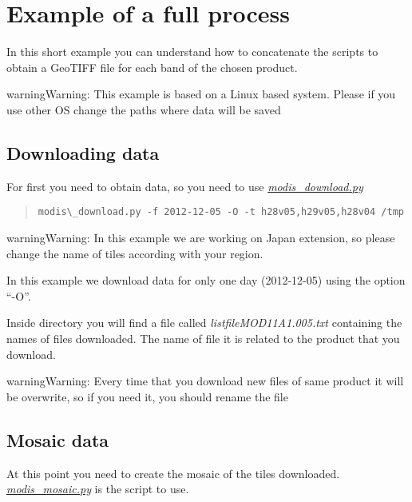 \documentclass[a4paper,11pt,oneside]{sphinxmanual}
\begin{document}
\chapter{Example of a full process}
\label{examples/full_example::doc}\label{examples/full_example:example-of-a-full-process}
In this short example you can understand how to concatenate
the scripts to obtain a GeoTIFF file for each band of the
chosen product.

\begin{notice}{warning}{Warning:}
This example is based on a Linux based system. Please if
you use other OS change the paths where data will be saved
\end{notice}


\section{Downloading data}
\label{examples/full_example:downloading-data}
For first you need to obtain data, so you need to use {\hyperref[scripts/modis_download::doc]{\emph{modis\_download.py}}}
\begin{quote}

\begin{Verbatim}[commandchars=\\\{\}]
modis\_download.py -f 2012-12-05 -O -t h28v05,h29v05,h28v04 /tmp
\end{Verbatim}
\end{quote}

\begin{notice}{warning}{Warning:}
In this example we are working on Japan extension, so please
change the name of tiles according with your region.

In this example we download data for only one day (2012-12-05)
using the option ``-O''.
\end{notice}

Inside  directory you will find a file called \emph{listfileMOD11A1.005.txt}
containing the names of files downloaded. The name of file it is related to
the product that you download.

\begin{notice}{warning}{Warning:}
Every time that you download new files of same product it will be overwrite,
so if you need it, you should rename the file
\end{notice}


\section{Mosaic data}
\label{examples/full_example:mosaic-data}
At this point you need to create the mosaic of the tiles downloaded.
{\hyperref[scripts/modis_mosaic::doc]{\emph{modis\_mosaic.py}}} is the script to use.
\end{document}
